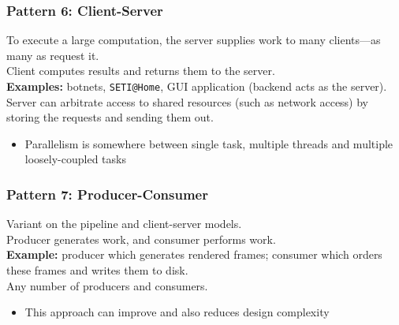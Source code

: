 \begin{frame}
  \frametitle{Pattern 6: Client-Server}

  
    To execute a large computation, the server supplies work to many
      clients---as many as request it.\\[1em]

    Client computes results and returns them to the server.\\[1em]
   {\bf Examples:} botnets, {\tt SETI@Home}, GUI application (backend
      acts as the server).\\[1em]
   Server can arbitrate access to shared resources (such as network
      access) by storing the requests and sending them out.\\[1em]

   \begin{itemize}
    \item Parallelism is somewhere between single task, multiple threads and
      multiple loosely-coupled tasks  
  \end{itemize}
  
\end{frame}

\begin{frame}
  \frametitle{Pattern 7: Producer-Consumer}

  
    Variant on the pipeline and client-server models.\\
    Producer generates work, and consumer performs work.\\[1em]
    {\bf Example:} producer which generates rendered frames;
      consumer which orders these frames and writes them to disk.\\[1em]
    Any number of producers and consumers.\\[1em]

    \begin{itemize}
    \item This approach can improve  and also reduces
      design complexity
    \end{itemize}
  
\end{frame}

